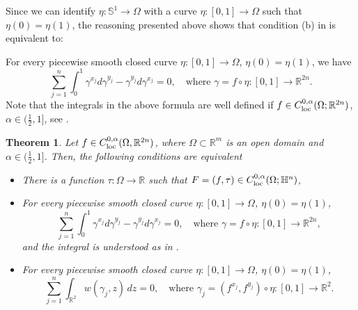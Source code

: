 \documentclass[intlimits,12pt,reqno]{amsart}
\newcommand{\Sph}{\mathbb S}
\newcommand{\bbbh}{\mathbb H}
\newcommand{\R}{\mathbb R}
\numberwithin{equation}{section}
\newtheorem{theorem}{Theorem}[section]
\theoremstyle{definition}
\begin{document}
Since we can identify $\eta:\Sph^1\to\Omega$ with a curve $\eta:[0,1]\to\Omega$ such that $\eta(0)=\eta(1)$, the reasoning presented above shows that
condition (b) in  is equivalent to:

For every piecewise smooth closed curve $\eta:[0,1]\to\Omega$, $\eta(0)=\eta(1)$, we have
$$
\sum_{j=1}^n\int_0^1  \gamma^{x_j}d\gamma^{y_j}-\gamma^{y_j}d\gamma^{x_j}=0,
\quad
\text{where } \gamma=f\circ\eta:[0,1]\to\R^{2n}.
$$
Note that the integrals in the above formula are well defined if $f\in C^{0,\alpha}_{\rm loc}(\Omega;\R^{2n})$, $\alpha\in (\frac{1}{2},1]$, see . 
\begin{theorem}
\label{T69}
Let $f\in C^{0,\alpha}_{\rm loc}(\Omega,\R^{2n})$, where $\Omega\subset\R^m$ is an open domain and $\alpha\in(\frac{1}{2},1]$. Then, the following conditions are equivalent
\begin{itemize}
\item[(a)] There is a function $\tau:\Omega\to\R$ such that
$F=(f,\tau)\in C^{0,\alpha}_{\rm loc}(\Omega;\bbbh^n)$,
\item[(b)] For every piecewise smooth closed curve 
$\eta:[0,1]\to \Omega$, $\eta(0)=\eta(1)$,
\begin{equation}
\label{eq65}
\sum_{j=1}^n\int_0^1  \gamma^{x_j}d\gamma^{y_j}-\gamma^{y_j}d\gamma^{x_j}=0,
\quad
\text{where } \gamma=f\circ\eta:[0,1]\to\R^{2n},
\end{equation}
and the integral is understood as in .
\item[(c)] For every piecewise smooth closed curve 
$\eta:[0,1]\to \Omega$, $\eta(0)=\eta(1)$,
$$
\sum_{j=1}^n\int_{\R^2}  w(\gamma_j,z)\, dz=0,
\quad
\text{where } \gamma_j=(f^{x_j},f^{y_j})\circ\eta:[0,1]\to\R^{2}.
$$
\end{itemize}
\end{theorem}
\end{document}
